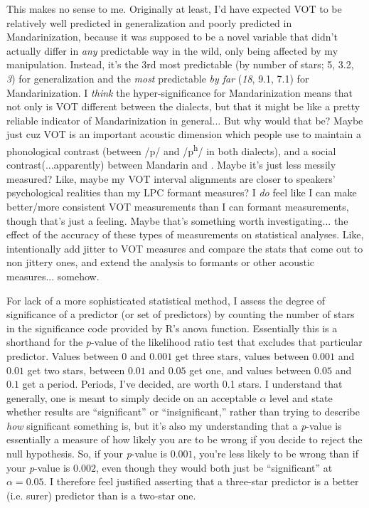 This makes no sense to me. Originally at least, I'd have expected VOT to be relatively well predicted in generalization and poorly predicted in Mandarinization, because it was supposed to be a novel variable that didn't actually differ in \emph{any} predictable way in the wild, only being affected by my manipulation. Instead, it's the 3rd most predictable (by number of stars; 5, 3.2, \emph{3}) for generalization and the \emph{most} predictable \emph{by far} (\emph{18}, 9.1, 7.1) for Mandarinization. I \emph{think} the hyper-significance for Mandarinization means that not only is VOT different between the dialects, but that it might be like a pretty reliable indicator of Mandarinization in general... But why would that be? Maybe just cuz VOT is an important acoustic dimension which people use to maintain a phonological contrast (between /p/ and /p\textsuperscript{h}/ in both dialects), and a social contrast(...apparently) between Mandarin and \ND{}. Maybe it's just less messily measured? Like, maybe my VOT interval alignments are closer to speakers' psychological realities than my LPC formant measures? I \emph{do} feel like I can make better\slash more consistent VOT measurements than I can formant measurements, though that's just a feeling. Maybe that's something worth investigating... the effect of the accuracy of these types of measurements on statistical analyses. Like, intentionally add jitter to VOT measures and compare the stats that come out to non jittery ones, and extend the analysis to formants or other acoustic measures... somehow.

For lack of a more sophisticated statistical method, I assess the degree of significance of a predictor (or set of predictors) by counting the number of stars in the significance code provided by R's \citep{r2013r} anova function. Essentially this is a shorthand for the \textit{p}-value of the likelihood ratio test that excludes that particular predictor. Values between $0$ and $0.001$ get three stars, values between $0.001$ and $0.01$ get two stars, between $0.01$ and $0.05$ get one, and values between $0.05$ and $0.1$ get a period. Periods, I've decided, are worth 0.1 stars. I understand that generally, one is meant to simply decide on an acceptable $\alpha$ level and state whether results are ``significant'' or ``insignificant,'' rather than trying to describe \emph{how} significant something is, but it's also my understanding that a \textit{p}-value is essentially a measure of how likely you are to be wrong if you decide to reject the null hypothesis. So, if your \textit{p}-value is $0.001$, you're less likely to be wrong than if your \textit{p}-value is $0.002$, even though they would both just be ``significant'' at $\alpha = 0.05$. I therefore feel justified asserting that a three-star predictor is a better (i.e. surer) predictor than is a two-star one.

